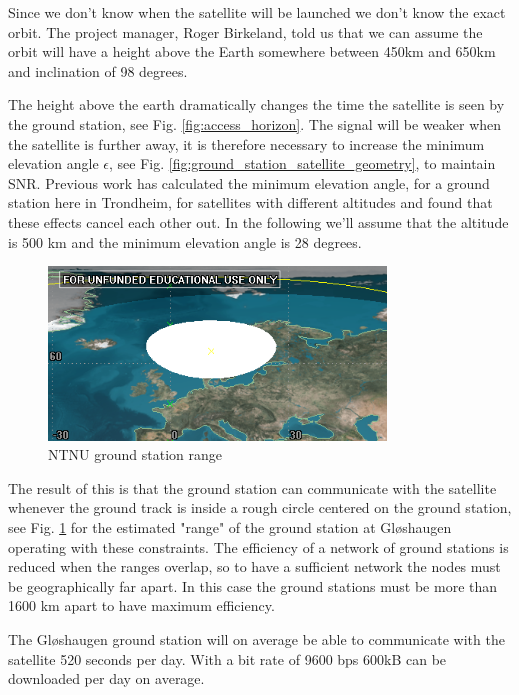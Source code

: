 Since we don't know when the satellite will be launched we don't know the exact orbit. The project manager, Roger Birkeland, told us that we can assume the orbit will  have a height above the Earth somewhere between 450km and 650km and inclination of 98 degrees.

The height above the earth dramatically changes the time the satellite is seen by the ground station, see Fig. \ref{fig:access_horizon}. The signal will be weaker when the satellite is further away, it is therefore necessary to increase the minimum elevation angle $\epsilon$, see Fig. \ref{fig:ground_station_satellite_geometry}, to maintain SNR.  Previous work\cite{antennemaster,bildemaster} has calculated the minimum elevation angle, for a ground station here in Trondheim, for satellites with different altitudes and found that these effects cancel each other out. In the following we'll assume that the altitude is 500 km and the minimum elevation angle is 28 degrees.

\begin{figure}
  \begin{center}
    \includegraphics[width=0.8\textwidth]{Figures/ntnu_footprint}
  \end{center}
  \caption[NTNU footprint]{NTNU ground station range}
  \label{fig:ntnu_range}
\end{figure}

The result of this is that the ground station can communicate with the satellite whenever the ground track is inside a rough circle centered on the ground station, see Fig. \ref{fig:ntnu_range} for the estimated "range" of the ground station at Gløshaugen operating with these constraints. The efficiency of a network of ground stations is reduced when the ranges overlap, so to have a sufficient network the nodes must be geographically far apart. In this case the ground stations must be more than 1600 km apart to have maximum efficiency.

The Gløshaugen ground station will on average be able to communicate with the satellite 520 seconds per day. With a bit rate of 9600 bps 600kB can be downloaded per day on average.

